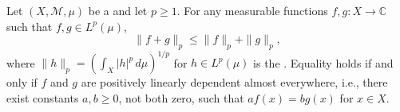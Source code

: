 \begin{proposition} \label{proposition:minkowski_inequality_for_L_p_norms}
Let $(X, \mathcal{M}, \mu)$ be a  and let $p \geq 1$. For any measurable functions $f, g : X \to \mathbb{C}$ such that $f, g \in L^p(\mu)$,
$$\|f + g\|_p \leq \|f\|_p + \|g\|_p,$$
where $\|h\|_p = \left(\int_X |h|^p \, d\mu\right)^{1/p}$ for $h \in L^p(\mu)$ is the . Equality holds if and only if $f$ and $g$ are positively linearly dependent almost everywhere, i.e., there exist constants $a, b \geq 0$, not both zero, such that $af(x) = bg(x)$ for  $x \in X$.
\end{proposition}

